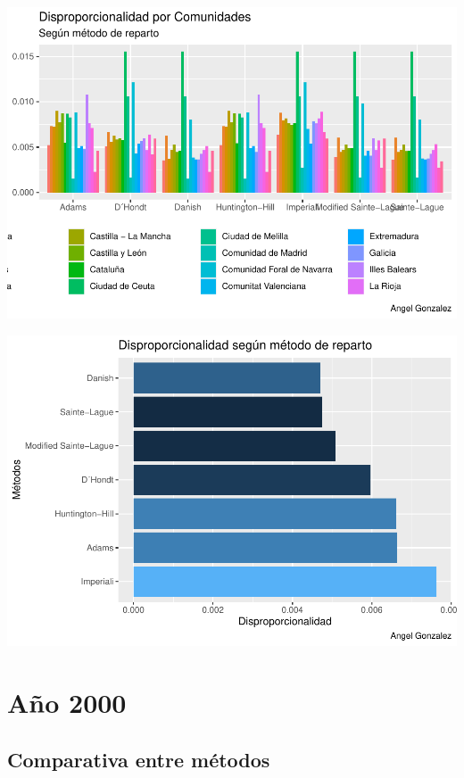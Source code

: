 \documentclass[12pt,a4paper,]{book}
\numberwithin{dummy}{section}
\theoremstyle{ocrenumbox}
\theoremstyle{blacknumex}
\theoremstyle{blacknumbox}
\theoremstyle{ocrenum}
\theoremstyle{ocrenum}
\begin{document}
\begin{center}\includegraphics[width=0.95\linewidth]{figurasR/unnamed-chunk-66-1} \end{center}

\begin{center}\includegraphics[width=0.95\linewidth]{figurasR/unnamed-chunk-66-2} \end{center}

\hypertarget{auxf1o-2000}{%
\section{Año 2000}\label{auxf1o-2000}}

\hypertarget{comparativa-entre-muxe9todos-7}{%
\subsection{Comparativa entre
métodos}\label{comparativa-entre-muxe9todos-7}}
\end{document}
